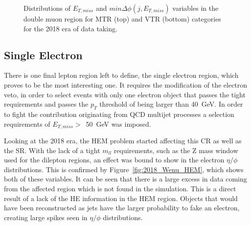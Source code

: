 \begin{figure}[htbp]
{    }
  \caption{Distributions of $E_{T,miss}$ and $min\Delta\phi(j,E_{T,miss})$ variables in the double muon region for MTR (top) and VTR (bottom) categories for the 2018 era of data taking.}
  \label{fig:2018_Zee_2}
\end{figure}


\subsection{Single Electron}
\label{sec:single_electron}
\hspace{10pt} There is one final lepton region left to define, the single electron region, which proves to be the most interesting one. It requires the modification of the electron veto, in order to select events with only one electron object that passes the tight requirements and passes the $p_T$ threshold of being larger than 40~GeV. In order to fight the contribution originating from QCD multijet processes a selection requirements of $E_{T,miss}>$~50~GeV was imposed.

\hspace{10pt} Looking at the 2018 era, the HEM problem started affecting this CR as well as the SR. With the lack of a tight $m_{ll}$ requirements, such as the Z mass window used for the dilepton regions, an effect was bound to show in the electron $\eta/\phi$ distributions. This is confirmed by Figure~\ref{fig:2018_Wenu_HEM}, which shows both of these variables. It can be seen that there is a large excess in data coming from the affected region which is not found in the simulation. This is a direct result of a lack of the HE information in the HEM region. Objects that would have been reconstructed as jets have the larger probability to fake an electron, creating large spikes seen in $\eta/\phi$ distributions.

